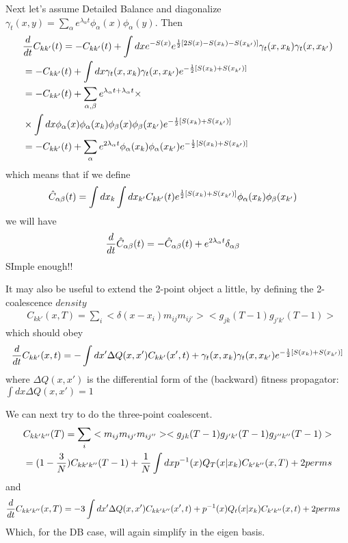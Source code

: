 \documentclass{article}
\begin{document}
Next let's assume Detailed Balance and diagonalize $\gamma_t(x,y)=\sum_{\alpha}e^{\lambda_{\alpha} t}\phi_{\alpha}(x)\phi_{\alpha}(y)$. Then
\begin{eqnarray}
&{d \over dt} C_{kk'}(t)=- C_{kk'}(t)+ \int dx e^{-S(x)}   e^{{1 \over 2} [2S(x)-S(x_{k})-S(x_{k'})]}\gamma_t(x,x_{k})\gamma_t(x,x_{k'})\\
&=- C_{kk'}(t)+ \int dx \gamma_t(x,x_{k})\gamma_t(x,x_{k'})e^{-{1 \over 2} [S(x_{k})+S(x_{k'})]}\\
&=- C_{kk'}(t)+ \sum_{\alpha, \beta}e^{\lambda_{\alpha} t+\lambda_{\alpha} t } \times \\
&\times \int dx \phi_{\alpha}(x)\phi_{\alpha}(x_{k})\phi_{\beta}(x)
\phi_{\beta}(x_{k'})e^{-{1 \over 2} [S(x_{k})+S(x_{k'})]}\\
&=- C_{kk'}(t)+ \sum_{\alpha}e^{2\lambda_{\alpha} t } \phi_{\alpha}(x_{k})
\phi_{\alpha}(x_{k'})e^{-{1 \over 2} [S(x_{k})+S(x_{k'})]}
\end{eqnarray}
which means that if we define
\begin{eqnarray}
&{\hat C}_{\alpha \beta}(t)=\int dx_k \int dx_{k'} C_{kk'}(t)e^{{1 \over 2} [S(x_{k})+S(x_{k'})]}\phi_{\alpha}(x_{k}) \phi_{\beta}(x_{k'})
\end{eqnarray}
we will have
\begin{eqnarray}
&{d \over dt} {\hat C}_{\alpha \beta}(t)=-{\hat C}_{\alpha \beta}(t)+ e^{2\lambda_{\alpha} t }\delta_{\alpha \beta}
\end{eqnarray}
SImple enough!!

It may also be useful to extend the 2-point object a little, by defining the 2-coalescence $density$
\begin{eqnarray}
&C_{kk'}(x,T)= \sum_i <\delta(x-x_{i})m_{ij}m_{ij'}><g_{jk}(T-1)g_{j'k'}(T-1)>
\end{eqnarray}
which should obey
\begin{eqnarray}
&{d \over dt} C_{kk'}(x,t)=- \int dx' \Delta Q(x,x') C_{kk'}(x',t)+ \gamma_t(x,x_{k})\gamma_t(x,x_{k'})e^{-{1 \over 2} [S(x_{k})+S(x_{k'})]}\\
\end{eqnarray}
where $\Delta Q(x,x')$ is the differential form of the (backward) fitness propagator: $\int dx \Delta Q(x,x')=1$

We can next try to do the three-point coalescent.
\begin{eqnarray}
&C_{kk'k''}(T)= \sum_i <m_{ij}m_{ij'}m_{ij''}><g_{jk}(T-1)g_{j'k'}(T-1)g_{j''k''}(T-1)>\\
&= (1-{3 \over N}) C_{kk'k''}(T-1)+{1 \over N} \int dx p^{-1} (x) {Q_T(x|x_k)C_{k'k''}(x,T) } +2 perms
\end{eqnarray}
and
\begin{eqnarray}
&{d \over dt}C_{kk'k''}(x,T)=  -3\int dx' \Delta Q(x,x') C_{kk'k''}(x',t)+ p^{-1} (x) {Q_t(x|x_k)C_{k'k''}(x,t) } +2 perms
\end{eqnarray}
Which, for the DB case, will again simplify in the eigen basis.
\end{document}
